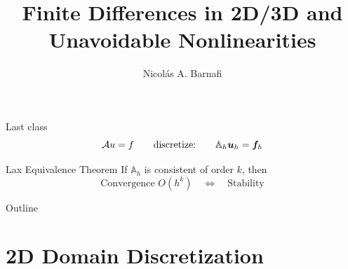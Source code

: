 \documentclass[aspectratio=169]{beamer}
\title[Finite Differences in 2D/3D \& Nonlinearities]{Finite Differences in 2D/3D and \\ Unavoidable Nonlinearities}
\author{Nicol\'as A. Barnafi}
\date{}
\renewcommand{\vec}{\vectorsym}
\begin{document}
\begin{frame}
    \titlepage
\end{frame}

\begin{frame}{Last class}
    $$\mathcal A u = f \qquad \text{discretize:}\qquad \mathbb A_h \vec u_h = \vec f_h $$
    \begin{block}{Lax Equivalence Theorem}
        If $\mathbb A_h$ is consistent of order $k$, then
        $$ \text{Convergence $O(h^k)$} \quad \Leftrightarrow \quad \text{Stability} $$
    \end{block}
\end{frame}

\begin{frame}{Outline}
    \tableofcontents
\end{frame}

\section{2D Domain Discretization}
\end{document}
